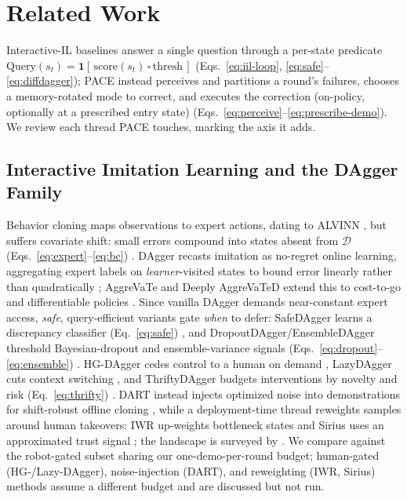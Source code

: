 \documentclass[letterpaper]{article} %
\begin{document}
\section{Related Work}
\label{sec:related}

Interactive-IL baselines answer a single question through a per-state predicate
$\mathrm{Query}(s_t)\!=\!\mathbf{1}[\,\mathrm{score}(s_t)\,\square\,\mathrm{thresh}\,]$
(Eqs.~\eqref{eq:iil-loop}, \eqref{eq:safe}--\eqref{eq:diffdagger}); PACE instead
perceives and partitions a round's failures, chooses a memory-rotated mode to
correct, and executes the correction (on-policy, optionally at a prescribed entry
state) (Eqs.~\eqref{eq:perceive}--\eqref{eq:prescribe-demo}). We review each thread
PACE touches, marking the axis it adds.

\subsection{Interactive Imitation Learning and the DAgger Family}
Behavior cloning maps observations to expert actions, dating to ALVINN
\cite{pomerleau1988alvinn,pomerleau1991efficient}, but suffers covariate shift:
small errors compound into states absent from $\mathcal{D}$
(Eqs.~\eqref{eq:expert}--\eqref{eq:bc}) \cite{ross2011dagger,laskey2017dart}. DAgger
recasts imitation as no-regret online learning, aggregating expert labels on
\emph{learner}-visited states to bound error linearly rather than quadratically
\cite{ross2011dagger}; AggreVaTe and Deeply AggreVaTeD extend this to cost-to-go and
differentiable policies \cite{ross2014aggrevate,sun2017aggrevated}. Since vanilla
DAgger demands
near-constant expert access, \emph{safe}, query-efficient variants gate \emph{when}
to defer: SafeDAgger learns a discrepancy classifier (Eq.~\eqref{eq:safe})
\cite{zhang2017safedagger}, and DropoutDAgger/EnsembleDAgger threshold
Bayesian-dropout and ensemble-variance signals
(Eqs.~\eqref{eq:dropout}--\eqref{eq:ensemble})
\cite{menda2017dropoutdagger,menda2019ensembledagger}. HG-DAgger cedes control to a
human on demand \cite{kelly2019hgdagger}, LazyDAgger cuts context switching
\cite{hoque2021lazydagger}, and ThriftyDAgger budgets interventions by novelty and
risk (Eq.~\eqref{eq:thrifty}) \cite{hoque2021thriftydagger}. DART instead injects
optimized noise into demonstrations for shift-robust offline cloning
\cite{laskey2017dart}, while a deployment-time thread reweights samples around human
takeovers: IWR up-weights bottleneck states \cite{mandlekar2020iwr} and Sirius uses
an approximated trust signal \cite{liu2023sirius}; the landscape is surveyed by
\citet{celemin2022iil}. We compare against the robot-gated subset sharing our
one-demo-per-round budget; human-gated (HG-/Lazy-DAgger), noise-injection (DART),
and reweighting (IWR, Sirius) methods assume a different budget and are discussed
but not run.
\end{document}
